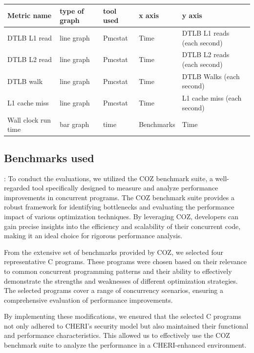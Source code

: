 \documentclass[acmsmall,screen,review]{acmart}
\begin{document}
\begin{table}[!ht]
  \centering
  \begin{tabular}{|l|l|l|l|l|}
  \hline
      Metric name & type of graph & tool used & x axis & y axis \\ \hline
      DTLB L1 read & line graph & Pmcstat & Time & DTLB L1 reads (each second) \\ \hline
      DTLB L2 read & line graph & Pmcstat & Time & DTLB L2 reads (each second) \\ \hline
      DTLB walk & line graph & Pmcstat & Time & DTLB Walks (each second) \\ \hline
      L1 cache miss & line graph & Pmcstat & Time & L1 cache miss (each second) \\ \hline
      Wall clock run time & bar graph & time & Benchmarks & Time \\ \hline
  \end{tabular}
\end{table}

\subsection{Benchmarks used}:
To conduct the evaluations, we utilized the COZ benchmark suite, a well-regarded tool specifically designed 
to measure and analyze performance improvements in concurrent programs. The COZ benchmark suite provides a
robust framework for identifying bottlenecks and evaluating the performance impact of various optimization
techniques. By leveraging COZ, developers can gain precise insights into the efficiency and scalability of
their concurrent code, making it an ideal choice for rigorous performance analysis.

From the extensive set of benchmarks provided by COZ, we selected four representative C programs. 
These programs were chosen based on their relevance to common concurrent programming patterns and
their ability to effectively demonstrate the strengths and weaknesses of different optimization 
strategies. The selected programs cover a range of concurrency scenarios, ensuring a comprehensive
evaluation of performance improvements.

By implementing these modifications, we ensured that the selected C programs not only adhered to
CHERI's security model but also maintained their functional and performance characteristics. 
This allowed us to effectively use the COZ benchmark suite to analyze the performance in a CHERI-enhanced environment.
\end{document}
